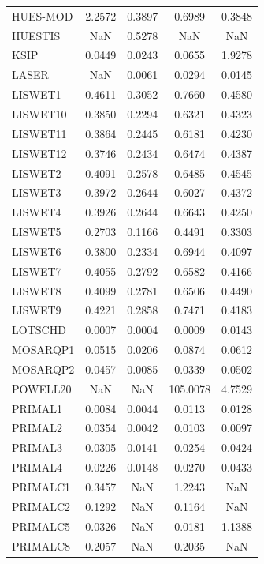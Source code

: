 \begin{longtable}{lcccc}
HUES-MOD &   2.2572 &   0.3897 &   0.6989 &   0.3848 \\
HUESTIS  &      NaN &   0.5278 &      NaN &      NaN \\
KSIP     &   0.0449 &   0.0243 &   0.0655 &   1.9278 \\
LASER    &      NaN &   0.0061 &   0.0294 &   0.0145 \\
LISWET1  &   0.4611 &   0.3052 &   0.7660 &   0.4580 \\
LISWET10 &   0.3850 &   0.2294 &   0.6321 &   0.4323 \\
LISWET11 &   0.3864 &   0.2445 &   0.6181 &   0.4230 \\
LISWET12 &   0.3746 &   0.2434 &   0.6474 &   0.4387 \\
LISWET2  &   0.4091 &   0.2578 &   0.6485 &   0.4545 \\
LISWET3  &   0.3972 &   0.2644 &   0.6027 &   0.4372 \\
LISWET4  &   0.3926 &   0.2644 &   0.6643 &   0.4250 \\
LISWET5  &   0.2703 &   0.1166 &   0.4491 &   0.3303 \\
LISWET6  &   0.3800 &   0.2334 &   0.6944 &   0.4097 \\
LISWET7  &   0.4055 &   0.2792 &   0.6582 &   0.4166 \\
LISWET8  &   0.4099 &   0.2781 &   0.6506 &   0.4490 \\
LISWET9  &   0.4221 &   0.2858 &   0.7471 &   0.4183 \\
LOTSCHD  &   0.0007 &   0.0004 &   0.0009 &   0.0143 \\
MOSARQP1 &   0.0515 &   0.0206 &   0.0874 &   0.0612 \\
MOSARQP2 &   0.0457 &   0.0085 &   0.0339 &   0.0502 \\
POWELL20 &      NaN &      NaN & 105.0078 &   4.7529 \\
PRIMAL1  &   0.0084 &   0.0044 &   0.0113 &   0.0128 \\
PRIMAL2  &   0.0354 &   0.0042 &   0.0103 &   0.0097 \\
PRIMAL3  &   0.0305 &   0.0141 &   0.0254 &   0.0424 \\
PRIMAL4  &   0.0226 &   0.0148 &   0.0270 &   0.0433 \\
PRIMALC1 &   0.3457 &      NaN &   1.2243 &      NaN \\
PRIMALC2 &   0.1292 &      NaN &   0.1164 &      NaN \\
PRIMALC5 &   0.0326 &      NaN &   0.0181 &   1.1388 \\
PRIMALC8 &   0.2057 &      NaN &   0.2035 &      NaN \\

\end{longtable}
